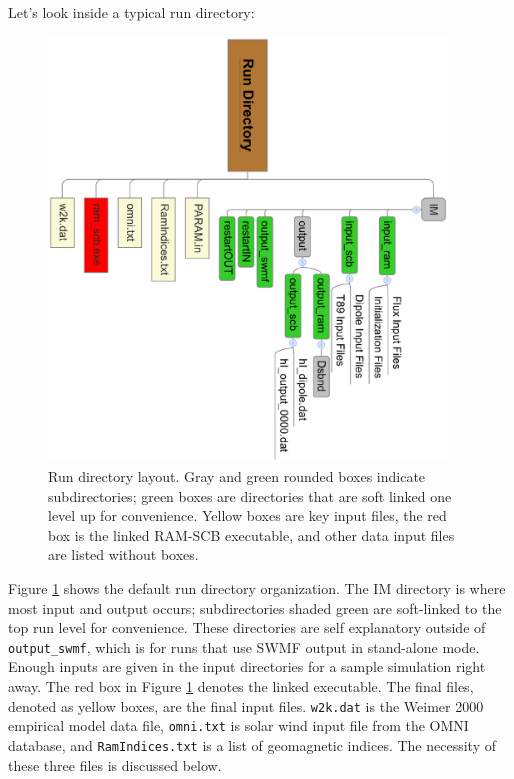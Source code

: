 Let's look inside a typical run directory:

\begin{figure}[h]
  \begin{center}
    \includegraphics[width=25pc,clip=True,angle=90]{rundir.ps}
  \end{center}
  \caption{Run directory layout.  Gray and green rounded boxes indicate 
  subdirectories; green boxes are directories that are soft linked one level
  up for convenience.  Yellow boxes are key input files, the red box is the
  linked RAM-SCB executable, and other data input files are listed without
  boxes.}
  \label{fig:rundir}
\end{figure}

Figure \ref{fig:rundir} shows the default run directory organization.  The
IM directory is where most input and output occurs; subdirectories shaded
green are soft-linked to the top run level for convenience.  These directories
are self explanatory outside of {\tt output\_swmf}, which is for runs that use
SWMF output in stand-alone mode.  Enough inputs are
given in the input directories for a sample simulation right away.  
The red box in Figure \ref{fig:rundir} denotes the linked executable.  The final
files, denoted as yellow boxes, are the final input files.  {\tt w2k.dat} is
the Weimer 2000 empirical model data file, {\tt omni.txt} is solar wind input 
file from the OMNI database, and {\tt RamIndices.txt} is a list of 
geomagnetic indices.  The necessity of these three files is discussed below.

